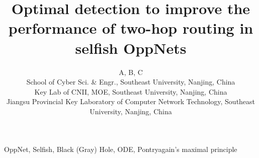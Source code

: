 \documentclass[10pt,conference]{IEEEtran}
\begin{document}
\title{
Optimal detection to improve the performance of two-hop routing in selfish OppNets
}
\author{A, B, C\\
        School of Cyber Sci. \& Engr., Southeast University, Nanjing, China\\
        Key Lab of CNII, MOE, Southeast University, Nanjing, China\\
        Jiangsu Provincial Key Laboratory of Computer Network Technology, Southeast University, Nanjing, China\\
        }
\maketitle

%
\begin{IEEEkeywords}
OppNet, Selfish, Black (Gray) Hole, ODE, Pontryagain's maximal principle
\end{IEEEkeywords}











\end{document}
